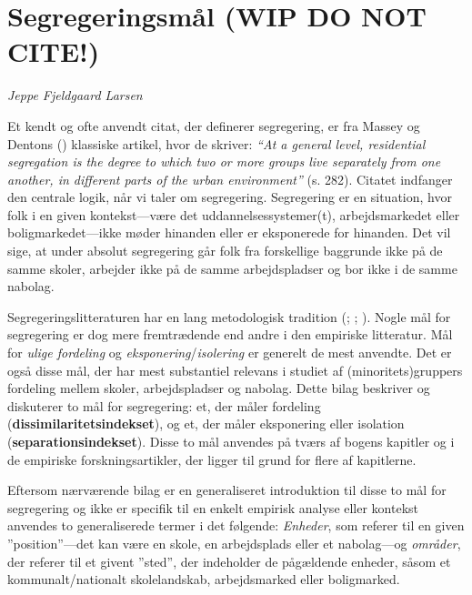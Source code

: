 \documentclass[
]{book}
\begin{document}
\appendix


\chapter{\texorpdfstring{Segregeringsmål (\textbf{WIP DO NOT CITE!})}{Segregeringsmål (WIP DO NOT CITE!)}}\label{bilag1}

\emph{Jeppe Fjeldgaard Larsen}

Et kendt og ofte anvendt citat, der definerer segregering, er fra Massey og Dentons () klassiske artikel, hvor de skriver: \emph{``At a general level, residential segregation is the degree to which two or more groups live separately from one another, in different parts of the urban environment''} (s. 282). Citatet indfanger den centrale logik, når vi taler om segregering. Segregering er en situation, hvor folk i en given kontekst---være det uddannelsessystemer(t), arbejdsmarkedet eller boligmarkedet---ikke møder hinanden eller er eksponerede for hinanden. Det vil sige, at under absolut segregering går folk fra forskellige baggrunde ikke på de samme skoler, arbejder ikke på de samme arbejdspladser og bor ikke i de samme nabolag.

Segregeringslitteraturen har en lang metodologisk tradition (; ; ). Nogle mål for segregering er dog mere fremtrædende end andre i den empiriske litteratur. Mål for \emph{ulige fordeling} og \emph{eksponering}/\emph{isolering} er generelt de mest anvendte. Det er også disse mål, der har mest substantiel relevans i studiet af (minoritets)gruppers fordeling mellem skoler, arbejdspladser og nabolag. Dette bilag beskriver og diskuterer to mål for segregering: et, der måler fordeling (\textbf{dissimilaritetsindekset}), og et, der måler eksponering eller isolation (\textbf{separationsindekset}). Disse to mål anvendes på tværs af bogens kapitler og i de empiriske forskningsartikler, der ligger til grund for flere af kapitlerne.

Eftersom nærværende bilag er en generaliseret introduktion til disse to mål for segregering og ikke er specifik til en enkelt empirisk analyse eller kontekst anvendes to generaliserede termer i det følgende: \emph{Enheder}, som referer til en given ''position''---det kan være en skole, en arbejdsplads eller et nabolag---og \emph{områder}, der referer til et givent ''sted'', der indeholder de pågældende enheder, såsom et kommunalt/nationalt skolelandskab, arbejdsmarked eller boligmarked.
\end{document}
